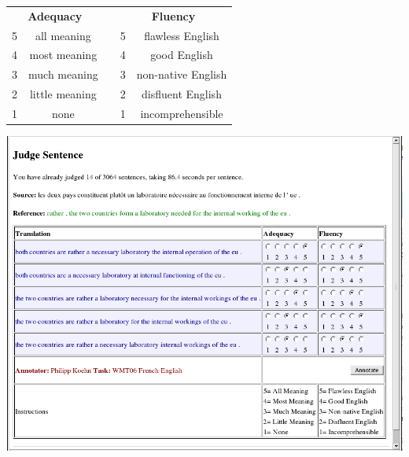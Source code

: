 \documentclass[landscape]{slides}
\begin{document}

\vspace{40mm}
\begin{center}
\begin{tabular}{|c|c|p{2cm}|c|c|} \cline{0-1} \cline{4-5}
\multicolumn{2}{|c|}{\bf Adequacy} & & \multicolumn{2}{|c|}{\bf Fluency} \\ \cline{0-1} \cline{4-5}
5 & all meaning &    & 5 & flawless English \\ \cline{0-1} \cline{4-5}
4 & most meaning &   & 4 & good  English \\ \cline{0-1} \cline{4-5}
3 & much meaning &   & 3 & non-native English \\ \cline{0-1} \cline{4-5}
2 & little meaning & & 2 & disfluent English \\ \cline{0-1} \cline{4-5}
1 & none &           & 1 & incomprehensible \\ \cline{0-1} \cline{4-5}
\end{tabular}
\end{center}



\begin{center}
\includegraphics[width=17.2cm]{evaluation-tool.png}
\end{center}

\end{document}
